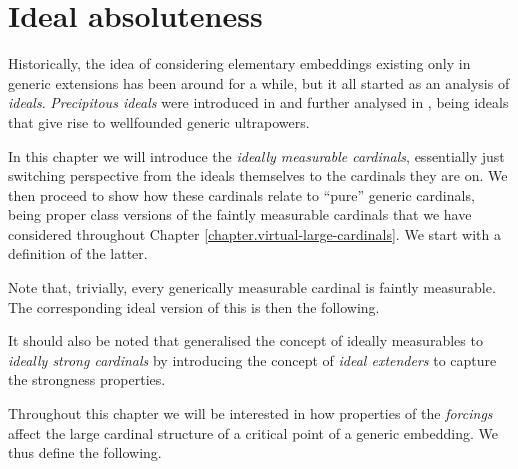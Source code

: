 \documentclass[../../main]{subfiles}
\begin{document}
\chapter{Ideal absoluteness}
\label{chapter.ideal-absoluteness}
\thispagestyle{fancy}

Historically, the idea of considering elementary embeddings existing only in generic extensions has been around for a while, but it all started as an analysis of \textit{ideals}. \textit{Precipitous ideals} were introduced in \cite{IdealGame} and further analysed in \cite{Precipitous}, being ideals that give rise to wellfounded generic ultrapowers.

\qquad In this chapter we will introduce the \textit{ideally measurable cardinals}, essentially just switching perspective from the ideals themselves to the cardinals they are on. We then proceed to show how these cardinals relate to ``pure'' generic cardinals, being proper class versions of the faintly measurable cardinals that we have considered throughout Chapter \ref{chapter.virtual-large-cardinals}. We start with a definition of the latter.


Note that, trivially, every generically measurable cardinal is faintly measurable. The corresponding ideal version of this is then the following.


It should also be noted that \cite{claverie-ideal-extenders} generalised the concept of ideally measurables to \textit{ideally strong cardinals} by introducing the concept of \textit{ideal extenders} to capture the strongness properties.

\qquad Throughout this chapter we will be interested in how properties of the \textit{forcings} affect the large cardinal structure of a critical point of a generic embedding. We thus define the following.

\end{document}
